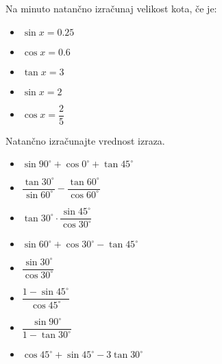             \begin{naloga}
                Na minuto natančno izračunaj velikost kota, če je:
            \begin{multicols}{2}
                \begin{itemize}
                    \item $\sin{x}=0.25$
                    \item $\cos{x}=0.6$
                    \item $\tan{x}=3$
                    \item $\sin{x}=2$
                    \item $\cos{x}=\dfrac{2}{5}$
                \end{itemize}
            \end{multicols}
            \end{naloga}

        


        
            \begin{naloga}
                Natančno izračunajte vrednost izraza.
            \begin{multicols}{2}
                \begin{itemize}
                            \item $\displaystyle \sin{90^\circ}+\cos{0^\circ}+\tan{45^\circ}$ 
                            \item $\displaystyle \dfrac{\tan{30^\circ}}{\sin{60^\circ}}-\dfrac{\tan{60^\circ}}{\cos{60^\circ}}$ 
                            \item $\displaystyle \tan{30^\circ}\cdot\dfrac{\sin{45^\circ}}{\cos{30^\circ}}$ 
                            \item $\displaystyle \sin{60^\circ}+\cos{30^\circ}-\tan{45^\circ}$ 
                            \item $\displaystyle \dfrac{\sin{30^\circ}}{\cos{30^\circ}}$ 
                            \item $\displaystyle \dfrac{1-\sin{45^\circ}}{\cos{45^\circ}}$ 
                            \item $\displaystyle \dfrac{\sin{90^\circ}}{1-\tan{30^\circ}}$ 
                            \item $\displaystyle \cos{45^\circ}+\sin{45^\circ}-3\tan{30^\circ}$ 
                \end{itemize}
            \end{multicols}
            \end{naloga}

